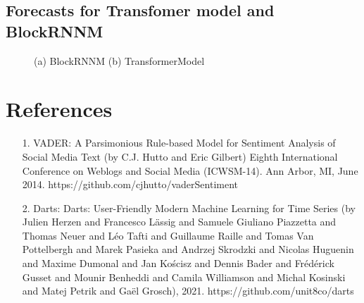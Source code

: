 \documentclass{article}
\begin{document}
\subsection{Forecasts for Transfomer model and BlockRNNM}
\begin{figure}[h]
    \centering
    \caption{(a) BlockRNNM (b) TransformerModel}
    \label{fig:foobar}
\end{figure}
\section{References}
\begin{itemize}
\item [1.] VADER: A Parsimonious Rule-based Model for Sentiment Analysis of Social Media Text
(by C.J. Hutto and Eric Gilbert)
Eighth International Conference on Weblogs and Social Media (ICWSM-14). Ann Arbor, MI, June 2014. https://github.com/cjhutto/vaderSentiment
\item [2.] Darts: Darts: User-Friendly Modern Machine Learning for Time Series (by Julien Herzen and Francesco Lässig and Samuele Giuliano Piazzetta and Thomas Neuer and Léo Tafti and Guillaume Raille and Tomas Van Pottelbergh and Marek Pasieka and Andrzej Skrodzki and Nicolas Huguenin and Maxime Dumonal and Jan Kościsz and Dennis Bader and Frédérick Gusset and Mounir Benheddi and Camila Williamson and Michal Kosinski and Matej Petrik and Gaël Grosch), 2021. 
https://github.com/unit8co/darts
\end{itemize}
\appendix
\end{document}
